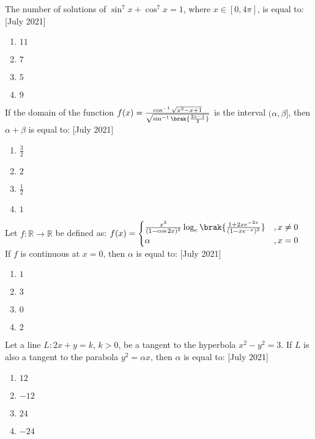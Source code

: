 \iffalse
\title{2021}
\author{AI24BTECH11012}
\section{mcq-single}
\fi
    \item The number of solutions of $ \sin^7 x + \cos^7 x = 1 $, where $ x \in [0, 4\pi] $, is equal to:
    \hfill{[July 2021]}
    \begin{enumerate}
        \item $11$
        \item $7$
        \item $5$
        \item $9$
    \end{enumerate}

    \item If the domain of the function $f(x) = \frac{\cos^{-1}\sqrt{x^2 - x + 1}}{\sqrt{\sin^{-1}\brak{\frac{2x-1}{2}}}}$ is the interval $ (\alpha, \beta] $, then $ \alpha + \beta $ is equal to:
    \hfill{[July 2021]}
    \begin{enumerate}
        \item $ \frac{3}{2} $
        \item $2$
        \item $ \frac{1}{2} $
        \item $1$
    \end{enumerate}

    \item Let $ f : \mathbb{R} \to \mathbb{R} $ be defined as:
    $f(x) =
    \begin{cases}
        \frac{x^3}{(1-\cos 2x)^2}\log_e\brak{\frac{1+2xe^{-2x}}{(1-xe^{-x})^2}} & , x \neq 0 \\
        \alpha & , x = 0
    \end{cases}$\\
    If $ f $ is continuous at $ x = 0 $, then $ \alpha $ is equal to:
    \hfill{[July 2021]}
    \begin{enumerate}
        \item $1$
        \item $3$
        \item $0$
        \item $2$
    \end{enumerate}

    \item Let a line $ L : 2x + y = k $, $ k > 0 $, be a tangent to the hyperbola $ x^2 - y^2 = 3 $. If $ L $ is also a tangent to the parabola $ y^2 = \alpha x $, then $ \alpha $ is equal to:
    \hfill{[July 2021]}
    \begin{enumerate}
        \item $12$
        \item $-12$
        \item $24$
        \item $-24$
    \end{enumerate}

